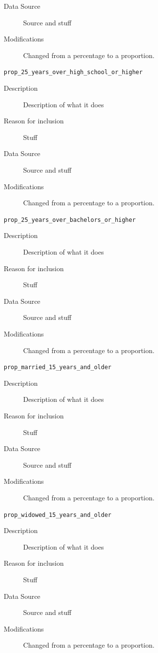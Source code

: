 \documentclass{article}
\begin{document}
\begin{itemize}[label={}, align=left]
\begin{description}
		      \item[Data Source] Source and stuff
		      \item[Modifications] Changed from a percentage to a proportion.
	      \end{description}
	\item[\texttt{prop\_25\_years\_over\_high\_school\_or\_higher}] \
	      \begin{description}
		      \item[Description] Description of what it does
		      \item[Reason for inclusion] Stuff
		      \item[Data Source] Source and stuff
		      \item[Modifications] Changed from a percentage to a proportion.
	      \end{description}
	\item[\texttt{prop\_25\_years\_over\_bachelors\_or\_higher}] \
	      \begin{description}
		      \item[Description] Description of what it does
		      \item[Reason for inclusion] Stuff
		      \item[Data Source] Source and stuff
		      \item[Modifications] Changed from a percentage to a proportion.
	      \end{description}
	\item[\texttt{prop\_married\_15\_years\_and\_older}] \
	      \begin{description}
		      \item[Description] Description of what it does
		      \item[Reason for inclusion] Stuff
		      \item[Data Source] Source and stuff
		      \item[Modifications] Changed from a percentage to a proportion.
	      \end{description}
	\item[\texttt{prop\_widowed\_15\_years\_and\_older}] \
	      \begin{description}
		      \item[Description] Description of what it does
		      \item[Reason for inclusion] Stuff
		      \item[Data Source] Source and stuff
		      \item[Modifications] Changed from a percentage to a proportion.

\end{description}
\end{itemize}
\end{document}
